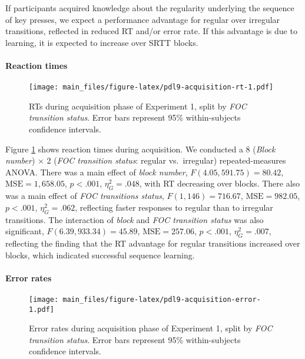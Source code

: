 \documentclass[man]{apa6}
\theoremstyle{definition}
\theoremstyle{definition}
\theoremstyle{definition}
\theoremstyle{remark}
\begin{document}
If participants acquired knowledge about the regularity underlying the
sequence of key presses, we expect a performance advantage for regular
over irregular transitions, reflected in reduced RT and/or error rate.
If this advantage is due to learning, it is expected to increase over
SRTT blocks.

\paragraph{Reaction times}\label{reaction-times}

\begin{figure}[htbp]
\centering
\texttt{[image: main\_files/figure-latex/pdl9-acquisition-rt-1.pdf]}
\caption{\label{fig:pdl9-acquisition-rt}RTs during acquisition phase of
Experiment 1, split by \emph{FOC transition status}. Error bars
represent 95\% within-subjects confidence intervals.}
\end{figure}

Figure \ref{fig:pdl9-acquisition-rt} shows reaction times during
acquisition. We conducted a 8 (\emph{Block number}) \(\times\) 2
(\emph{FOC transition status}: regular vs.~irregular) repeated-measures
ANOVA. There was a main effect of \emph{block number},
\(F(4.05, 591.75) = 80.42\), \(\mathrm{MSE} = 1,658.05\), \(p < .001\),
\(\eta^2_G = .048\), with RT decreasing over blocks. There also was a
main effect of \emph{FOC transitions status}, \(F(1, 146) = 716.67\),
\(\mathrm{MSE} = 982.05\), \(p < .001\), \(\eta^2_G = .062\), reflecting
faster responses to regular than to irregular transitions. The
interaction of \emph{block} and \emph{FOC transition status} was also
significant, \(F(6.39, 933.34) = 45.89\), \(\mathrm{MSE} = 257.06\),
\(p < .001\), \(\eta^2_G = .007\), reflecting the finding that the RT
advantage for regular transitions increased over blocks, which indicated
successful sequence learning.

\paragraph{Error rates}\label{error-rates}

\begin{figure}[htbp]
\centering
\texttt{[image: main\_files/figure-latex/pdl9-acquisition-error-1.pdf]}
\caption{\label{fig:pdl9-acquisition-error}Error rates during acquisition
phase of Experiment 1, split by \emph{FOC transition status}. Error bars
represent 95\% within-subjects confidence intervals.}
\end{figure}
\end{document}
